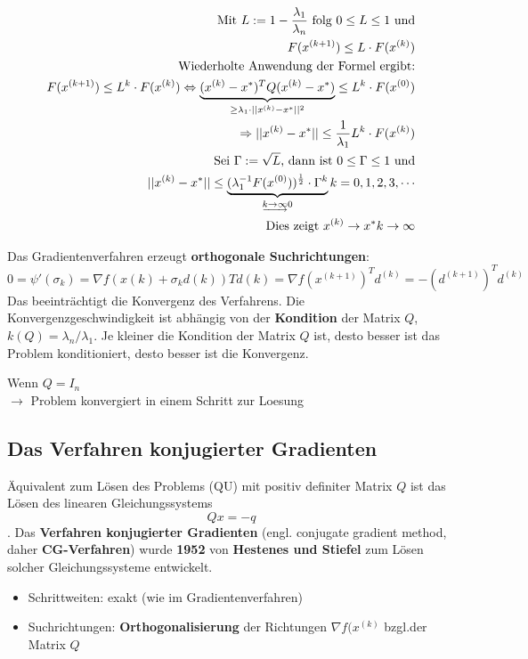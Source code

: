 \begin{equation}
\begin{aligned}
\text{Mit $L:=1-\frac{\lambda_1}{\lambda_n}$ folg $0\leq L\leq 1$ und}\\
F(x^{(k+1)})\leq L\cdot F(x^{(k)})\\
\text{Wiederholte Anwendung der Formel ergibt:}\\
F(x^{(k+1)}) \leq L^k\cdot F(x^{(k)}) \Leftrightarrow \underbrace{(x^{(k)}-x^{*})^TQ(x^{(k)}-x^{*})}_{\geq \lambda_1\cdot||x^{(k)}-x^{*}||^2}\leq L^k\cdot F(x^{(0)})\\
\Rightarrow ||x^{(k)}-x^{*}|| \leq \frac{1}{\lambda_1}L^k\cdot F(x^{(k)})\\
\text{Sei $\Gamma := \sqrt{L}$, dann ist $0 \leq \Gamma \le 1$ und}\\
||x^{(k)}-x^{*}|| \leq \underbrace{(\lambda_1^{-1}F(x^{(0)}))^\frac{1}{2}\cdot \Gamma^k}_{\underrightarrow{k \rightarrow \infty}0} \hfill k=0,1,2,3,\cdots\\
 \text{Dies zeigt } x^{(k)} \rightarrow x^{*} k \rightarrow \infty
     \end{aligned}
\end{equation}

Das Gradientenverfahren erzeugt \textbf{orthogonale Suchrichtungen}:
$$0 = \psi'(\sigma_k) = \nabla f(x(k) + \sigma_k d(k))Td(k) = \nabla f(x^{(k+1)})^Td^{(k)} = -(d^{(k+1)})^T d^{(k)}$$
Das beeinträchtigt die Konvergenz des Verfahrens.
Die Konvergenzgeschwindigkeit ist abhängig von der \textbf{Kondition} der Matrix $Q$,
$k(Q) = \lambda_n /\lambda_1$.
Je kleiner die Kondition der Matrix $Q$ ist, desto besser ist das Problem konditioniert, desto besser ist die Konvergenz.
\begin{Beispiel}
	Wenn $Q=I_n$\\
	$\rightarrow$ Problem konvergiert in einem Schritt zur Loesung
\end{Beispiel}
\subsection{Das Verfahren konjugierter Gradienten}
Äquivalent zum Lösen des Problems (QU) mit positiv definiter Matrix $Q$
ist das Lösen des linearen Gleichungssystems
$$Qx = -q$$.
Das \textbf{Verfahren konjugierter Gradienten} (engl. conjugate gradient method, daher \textbf{CG-Verfahren}) wurde \textbf{1952} von \textbf{Hestenes und Stiefel} zum Lösen solcher Gleichungssysteme entwickelt.
\begin{itemize}
	\item Schrittweiten: exakt (wie im Gradientenverfahren)
	\item Suchrichtungen: \textbf{Orthogonalisierung} der Richtungen $\nabla f(x^{(k)}$ bzgl.der Matrix $Q$
\end{itemize}
